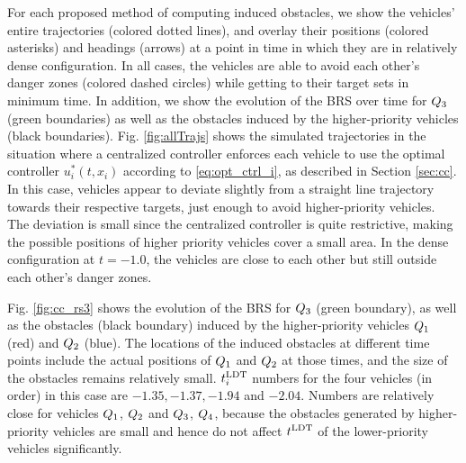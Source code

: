 For each proposed method of computing induced obstacles, we show the vehicles' entire trajectories (colored dotted lines), and overlay their positions (colored asterisks) and headings (arrows) at a point in time in which they are in relatively dense configuration. In all cases, the vehicles are able to avoid each other's danger zones (colored dashed circles) while getting to their target sets in minimum time. In addition, we show the evolution of the BRS over time for $Q_3$ (green boundaries) as well as the obstacles induced by the higher-priority vehicles (black boundaries).
%
Fig. \ref{fig:allTrajs} shows the simulated trajectories in the situation where a centralized controller enforces each vehicle to use the optimal controller $u^*_i(t, x_i)$ according to \eqref{eq:opt_ctrl_i}, as described in Section \ref{sec:cc}. In this case, vehicles appear to deviate slightly from a straight line trajectory towards their respective targets, just enough to avoid higher-priority vehicles. The deviation is small since the centralized controller is quite restrictive, making the possible positions of higher priority vehicles cover a small area. In the dense configuration at $t=-1.0$, the vehicles are close to each other but still outside each other's danger zones.

Fig. \ref{fig:cc_rs3} shows the evolution of the BRS for $Q_3$ (green boundary), as well as the obstacles (black boundary) induced by the higher-priority vehicles $Q_1$ (red) and $Q_2$ (blue). The locations of the induced obstacles at different time points include the actual positions of $Q_1$ and $Q_2$ at those times, and the size of the obstacles remains relatively small. $t^\text{LDT}_i$ numbers for the four vehicles (in order) in this case are $-1.35, -1.37, -1.94$ and $-2.04$. Numbers are relatively close for vehicles $Q_1$, $Q_2$ and $Q_3$, $Q_4$, because the obstacles generated by higher-priority vehicles are small and hence do not affect $t^\text{LDT}$ of the lower-priority vehicles significantly. 

